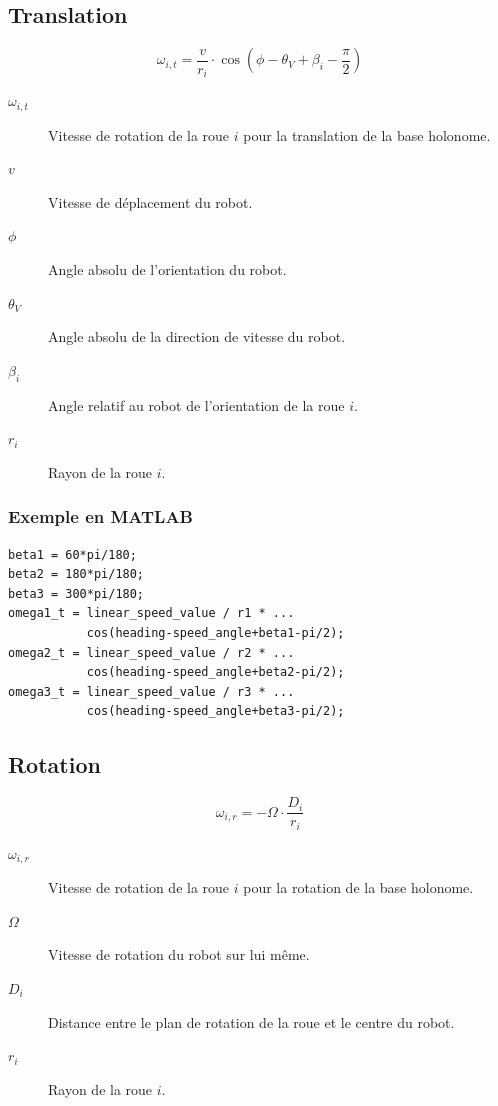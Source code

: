 \documentclass[a4paper]{paper}
\begin{document}
\subsection{Translation}

\begin{equation}
    \omega_{i,t} = \frac{v}{r_i} \cdot \cos\left( \phi - \theta_V + \beta_i - \frac{\pi}{2} \right)
    \label{eqn:forward-translation}
\end{equation}

\begin{description}
    \item[$\omega_{i,t}$] Vitesse de rotation de la roue $i$ pour la translation de la base holonome.
    \item[$v$] Vitesse de déplacement du robot.
    \item[$\phi$] Angle absolu de l'orientation du robot.
    \item[$\theta_V$] Angle absolu de la direction de vitesse du robot.
    \item[$\beta_i$] Angle relatif au robot de l'orientation de la roue $i$.
    \item[$r_i$] Rayon de la roue $i$.
\end{description}
\subsubsection{Exemple en MATLAB}

\begin{lstlisting}
beta1 = 60*pi/180;
beta2 = 180*pi/180;
beta3 = 300*pi/180;
omega1_t = linear_speed_value / r1 * ...
           cos(heading-speed_angle+beta1-pi/2);
omega2_t = linear_speed_value / r2 * ...
           cos(heading-speed_angle+beta2-pi/2);
omega3_t = linear_speed_value / r3 * ...
           cos(heading-speed_angle+beta3-pi/2);
\end{lstlisting}

\subsection{Rotation}
\begin{equation}
    \omega_{i, r} = - \Omega \cdot \frac{D_i}{r_i}
    \label{eqn:forward-rotation}
\end{equation}

\begin{description}
    \item[$\omega_{i,r}$] Vitesse de rotation de la roue $i$ pour la rotation de la base holonome.
    \item[$\Omega$] Vitesse de rotation du robot sur lui même.
    \item[$D_i$] Distance entre le plan de rotation de la roue et le centre du robot.
    \item[$r_i$] Rayon de la roue $i$.
\end{description}
\end{document}
